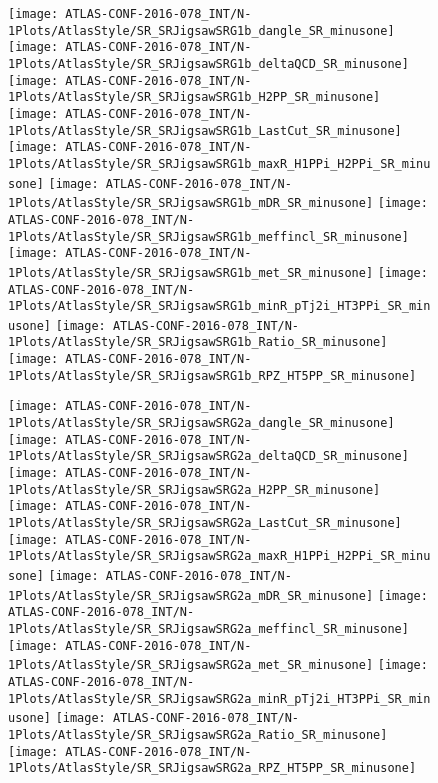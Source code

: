 \clearpage
\begin{figure}[tbph]
\begin{center}

\texttt{[image: ATLAS-CONF-2016-078\_INT/N-1Plots/AtlasStyle/SR\_SRJigsawSRG1b\_dangle\_SR\_minusone]}
\texttt{[image: ATLAS-CONF-2016-078\_INT/N-1Plots/AtlasStyle/SR\_SRJigsawSRG1b\_deltaQCD\_SR\_minusone]}
\texttt{[image: ATLAS-CONF-2016-078\_INT/N-1Plots/AtlasStyle/SR\_SRJigsawSRG1b\_H2PP\_SR\_minusone]}
\texttt{[image: ATLAS-CONF-2016-078\_INT/N-1Plots/AtlasStyle/SR\_SRJigsawSRG1b\_LastCut\_SR\_minusone]}
\texttt{[image: ATLAS-CONF-2016-078\_INT/N-1Plots/AtlasStyle/SR\_SRJigsawSRG1b\_maxR\_H1PPi\_H2PPi\_SR\_minusone]}
\texttt{[image: ATLAS-CONF-2016-078\_INT/N-1Plots/AtlasStyle/SR\_SRJigsawSRG1b\_mDR\_SR\_minusone]}
\texttt{[image: ATLAS-CONF-2016-078\_INT/N-1Plots/AtlasStyle/SR\_SRJigsawSRG1b\_meffincl\_SR\_minusone]}
\texttt{[image: ATLAS-CONF-2016-078\_INT/N-1Plots/AtlasStyle/SR\_SRJigsawSRG1b\_met\_SR\_minusone]}
\texttt{[image: ATLAS-CONF-2016-078\_INT/N-1Plots/AtlasStyle/SR\_SRJigsawSRG1b\_minR\_pTj2i\_HT3PPi\_SR\_minusone]}
\texttt{[image: ATLAS-CONF-2016-078\_INT/N-1Plots/AtlasStyle/SR\_SRJigsawSRG1b\_Ratio\_SR\_minusone]}
\texttt{[image: ATLAS-CONF-2016-078\_INT/N-1Plots/AtlasStyle/SR\_SRJigsawSRG1b\_RPZ\_HT5PP\_SR\_minusone]}
\end{center}
\caption{}
\label{fig:SR_SRJigsawSRG1b_mDR_SR_minusone}
\end{figure}

\begin{figure}[tbph]
\begin{center}
\texttt{[image: ATLAS-CONF-2016-078\_INT/N-1Plots/AtlasStyle/SR\_SRJigsawSRG2a\_dangle\_SR\_minusone]}
\texttt{[image: ATLAS-CONF-2016-078\_INT/N-1Plots/AtlasStyle/SR\_SRJigsawSRG2a\_deltaQCD\_SR\_minusone]}
\texttt{[image: ATLAS-CONF-2016-078\_INT/N-1Plots/AtlasStyle/SR\_SRJigsawSRG2a\_H2PP\_SR\_minusone]}
\texttt{[image: ATLAS-CONF-2016-078\_INT/N-1Plots/AtlasStyle/SR\_SRJigsawSRG2a\_LastCut\_SR\_minusone]}
\texttt{[image: ATLAS-CONF-2016-078\_INT/N-1Plots/AtlasStyle/SR\_SRJigsawSRG2a\_maxR\_H1PPi\_H2PPi\_SR\_minusone]}
\texttt{[image: ATLAS-CONF-2016-078\_INT/N-1Plots/AtlasStyle/SR\_SRJigsawSRG2a\_mDR\_SR\_minusone]}
\texttt{[image: ATLAS-CONF-2016-078\_INT/N-1Plots/AtlasStyle/SR\_SRJigsawSRG2a\_meffincl\_SR\_minusone]}
\texttt{[image: ATLAS-CONF-2016-078\_INT/N-1Plots/AtlasStyle/SR\_SRJigsawSRG2a\_met\_SR\_minusone]}
\texttt{[image: ATLAS-CONF-2016-078\_INT/N-1Plots/AtlasStyle/SR\_SRJigsawSRG2a\_minR\_pTj2i\_HT3PPi\_SR\_minusone]}
\texttt{[image: ATLAS-CONF-2016-078\_INT/N-1Plots/AtlasStyle/SR\_SRJigsawSRG2a\_Ratio\_SR\_minusone]}
\texttt{[image: ATLAS-CONF-2016-078\_INT/N-1Plots/AtlasStyle/SR\_SRJigsawSRG2a\_RPZ\_HT5PP\_SR\_minusone]}
\end{center}
\caption{}
\label{fig:SR_SRJigsawSRG2a_dangle_SR_minusone}
\end{figure}

